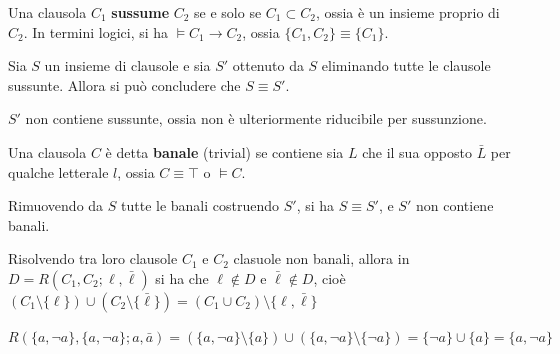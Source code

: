 \begin{defi}[Sussunzione]
        Una clausola $C_1$ \textbf{sussume} $C_2$ se e solo se 
        $C_1 \subset C_2$, ossia è un insieme proprio di $C_2$. 
        In termini logici, si ha $\models C_1 \rightarrow C_2$, 
        ossia $\{C_1, C_2\} \equiv \{C_1\}$.
\end{defi}        
\begin{defi}
        Sia $S$ un insieme di clausole e sia $S'$ ottenuto da 
        $S$ eliminando tutte le clausole sussunte. Allora si può 
        concludere che 
        $S \equiv S'$. 
\end{defi}
\begin{oss}
        $S'$ non contiene sussunte, ossia non è ulteriormente riducibile 
        per sussunzione.
\end{oss}
\begin{defi}
        Una clausola $C$ è detta \textbf{banale} (trivial) se contiene 
        sia $L$ che  il sua opposto $\bar{L}$ per qualche letterale 
        $l$, ossia $C \equiv \top$ o $\models C$. 
\end{defi}
\begin{defi}
        Rimuovendo da $S$ tutte le banali costruendo $S'$, 
        si ha $S \equiv S'$, e $S'$ non contiene banali.
\end{defi}
\begin{oss}
        Risolvendo tra loro clausole $C_1$ e $C_2$ clasuole non banali, 
        allora in $D = R(C_1, C_2; \ell, \bar{\ell})$ si ha 
        che $\ell \notin D$ e $\bar{\ell} \notin D$, 
        cioè $(C_1 \setminus \{\ell\}) \cup (C_2 \setminus \{ \bar{\ell}\}) = (C_1 \cup C_2) \setminus \{\ell, \bar{\ell}\}$
\end{oss}
\begin{oss}
        $R(\{a, \neg a\}, \{a, \neg a\}; a, \bar{a}) = ( \{a, \neg a\} \setminus \{a\}) \cup (\{a, \neg a\} \setminus \{\neg a\}) = \{\neg a\} \cup \{a\} = \{a, \neg a\}$
\end{oss}


